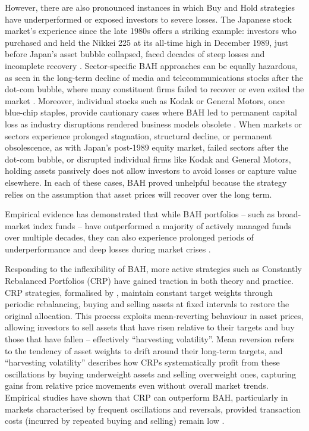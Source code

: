 \documentclass[12pt,a4paper]{report}
\begin{document}
However, there are also pronounced instances in which Buy and Hold strategies have underperformed or exposed investors to severe losses. The Japanese stock market’s experience since the late 1980s offers a striking example: investors who purchased and held the Nikkei 225 at its all-time high in December 1989, just before Japan’s asset bubble collapsed, faced decades of steep losses and incomplete recovery \citep{Campbell2001}. Sector-specific BAH approaches can be equally hazardous, as seen in the long-term decline of media and telecommunications stocks after the dot-com bubble, where many constituent firms failed to recover or even exited the market \citep{Ofek2003}. Moreover, individual stocks such as Kodak or General Motors, once blue-chip staples, provide cautionary cases where BAH led to permanent capital loss as industry disruptions rendered business models obsolete \citep{Friedman2011}. When markets or sectors experience prolonged stagnation, structural decline, or permanent obsolescence, as with Japan’s post-1989 equity market, failed sectors after the dot-com bubble, or disrupted individual firms like Kodak and General Motors, holding assets passively does not allow investors to avoid losses or capture value elsewhere. In each of these cases, BAH proved unhelpful because the strategy relies on the assumption that asset prices will recover over the long term.

Empirical evidence has demonstrated that while BAH portfolios -- such as broad-market index funds -- have outperformed a majority of actively managed funds over multiple decades, they can also experience prolonged periods of underperformance and deep losses during market crises \citep{Siegel1998, French2008}.

Responding to the inflexibility of BAH, more active strategies such as Constantly Rebalanced Portfolios (CRP) have gained traction in both theory and practice. CRP strategies, formalised by \citet{Cover1991}, maintain constant target weights through periodic rebalancing, buying and selling assets at fixed intervals to restore the original allocation. This process exploits mean-reverting behaviour in asset prices, allowing investors to sell assets that have risen relative to their targets and buy those that have fallen -- effectively ``harvesting volatility''. Mean reversion refers to the tendency of asset weights to drift around their long-term targets, and “harvesting volatility” describes how CRPs systematically profit from these oscillations by buying underweight assets and selling overweight ones, capturing gains from relative price movements even without overall market trends. Empirical studies have shown that CRP can outperform BAH, particularly in markets characterised by frequent oscillations and reversals, provided transaction costs (incurred by repeated buying and selling) remain low \citep{DeMiguel2009}.
\end{document}
